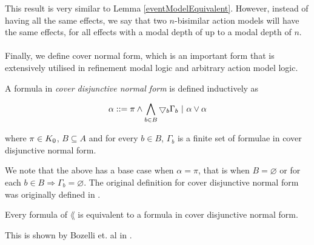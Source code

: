 This result is very similar to Lemma \ref{eventModelEquivalent}.
However, instead of having all the same effects, we say that two $n$-bisimilar action models will
have the same effects, for all effects with a modal depth of up to a modal depth of $n$.\\
\\
%

Finally, we define cover normal form, which is an important form that is extensively utilised in
refinement modal logic and arbitrary action model logic.

\begin{defn} \label{coverNormal}
	A formula in {\em cover disjunctive normal form} is defined inductively as

\[
	\alpha ::= \pi \land \bigwedge_{b \in B} \bigtriangledown_b \Gamma_b \text{ } | \text{ } \alpha \lor \alpha
\]

where $\pi \in K_0$, $B \subseteq A$ and for every $b \in B$, $\Gamma_b$ is a finite set of
formulae in cover disjunctive normal form.
\end{defn}

We note that the above has a base case when $\alpha = \pi$, that is when $B = \varnothing$ or for
each $b \in B \Rightarrow \Gamma_b = \varnothing$.
The original definition for cover disjunctive normal form was originally defined in
\cite{van2010future}.

\begin{lemma} \label{allInCoverNormal}
Every formula of $\lang$ is equivalent to a formula in cover disjunctive normal form.
\end{lemma}

This is shown by Bozelli et. al in \cite{DBLPjournalscorrabs12023538}.
